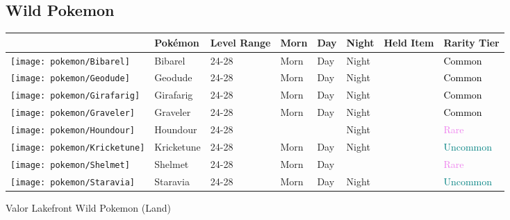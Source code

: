 \subsection{Wild Pokemon}%
\label{subsec:WildPokemon}%
\begin{longtable}{||l l l l l l l l||}%
\hline%
&Pokémon&Level Range&Morn&Day&Night&Held Item&Rarity Tier\\%
\hline%
\endhead%
\hline%
\texttt{[image: pokemon/Bibarel]}&Bibarel&24{-}28&Morn&Day&Night&&\textcolor{black}{%
Common%
}\\%
\hline%
\texttt{[image: pokemon/Geodude]}&Geodude&24{-}28&Morn&Day&Night&&\textcolor{black}{%
Common%
}\\%
\hline%
\texttt{[image: pokemon/Girafarig]}&Girafarig&24{-}28&Morn&Day&Night&&\textcolor{black}{%
Common%
}\\%
\hline%
\texttt{[image: pokemon/Graveler]}&Graveler&24{-}28&Morn&Day&Night&&\textcolor{black}{%
Common%
}\\%
\hline%
\texttt{[image: pokemon/Houndour]}&Houndour&24{-}28&&&Night&&\textcolor{violet}{%
Rare%
}\\%
\hline%
\texttt{[image: pokemon/Kricketune]}&Kricketune&24{-}28&Morn&Day&Night&&\textcolor{teal}{%
Uncommon%
}\\%
\hline%
\texttt{[image: pokemon/Shelmet]}&Shelmet&24{-}28&Morn&Day&&&\textcolor{violet}{%
Rare%
}\\%
\hline%
\texttt{[image: pokemon/Staravia]}&Staravia&24{-}28&Morn&Day&Night&&\textcolor{teal}{%
Uncommon%
}\\%
\hline%
\end{longtable}%
\caption{Valor Lakefront Wild Pokemon (Land)}